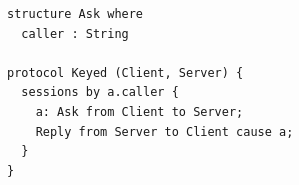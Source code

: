 \begin{lstlisting}[language={},basicstyle=\ttfamily\footnotesize,breaklines=true]
structure Ask where
  caller : String

protocol Keyed (Client, Server) {
  sessions by a.caller {
    a: Ask from Client to Server;
    Reply from Server to Client cause a;
  }
}
\end{lstlisting}
